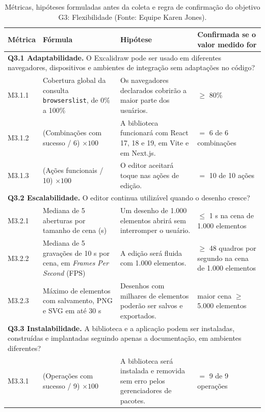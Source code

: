 \documentclass[12pt]{article}
\renewcommand{\arraystretch}{0.9}
\begin{document}
\begin{table}[!ht]
\centering
\caption{Métricas, hipóteses formuladas antes da coleta e regra de confirmação do objetivo G3: Flexibilidade (Fonte: Equipe Karen Jones).}
\label{tab:g3-metricas}
\vspace{2pt}
\scriptsize
\setlength{\tabcolsep}{3pt}
\renewcommand{\arraystretch}{0.90}
\begin{tabular}{p{1.2cm}p{5.5cm}p{5.0cm}p{3.6cm}}
\toprule
\textbf{Métrica} & \textbf{Fórmula} & \textbf{Hipótese} & \textbf{Confirmada se o valor medido for} \\
\midrule
\multicolumn{4}{p{16.2cm}}{\textbf{Q3.1 Adaptabilidade.} O Excalidraw pode ser usado em diferentes navegadores, dispositivos e ambientes de integração sem adaptações no código?} \\
M3.1.1 & Cobertura global da consulta \texttt{browserslist}, de 0\% a 100\% & Os navegadores declarados cobrirão a maior parte dos usuários. & $\geq$ 80\% \\
M3.1.2 & (Combinações com sucesso / 6) $\times 100$ & A biblioteca funcionará com React 17, 18 e 19, em Vite e em Next.js. & $=$ 6 de 6 combinações \\
M3.1.3 & (Ações funcionais / 10) $\times 100$ & O editor aceitará toque nas ações de edição. & $=$ 10 de 10 ações \\
\midrule
\multicolumn{4}{p{16.2cm}}{\textbf{Q3.2 Escalabilidade.} O editor continua utilizável quando o desenho cresce?} \\
M3.2.1 & Mediana de 5 aberturas por tamanho de cena (s) & Um desenho de 1.000 elementos abrirá sem interromper o usuário. & $\leq$ 1 s na cena de 1.000 elementos \\
M3.2.2 & Mediana de 5 gravações de 10 s por cena, em \textit{Frames Per Second} (FPS) & A edição será fluida com 1.000 elementos. & $\geq$ 48 quadros por segundo na cena de 1.000 elementos \\
M3.2.3 & Máximo de elementos com salvamento, PNG e SVG em até 30 s & Desenhos com milhares de elementos poderão ser salvos e exportados. & maior cena $\geq$ 5.000 elementos \\
\midrule
\multicolumn{4}{p{16.2cm}}{\textbf{Q3.3 Instalabilidade.} A biblioteca e a aplicação podem ser instaladas, construídas e implantadas seguindo apenas a documentação, em ambientes diferentes?} \\
M3.3.1 & (Operações com sucesso / 9) $\times 100$ & A biblioteca será instalada e removida sem erro pelos gerenciadores de pacotes. & $=$ 9 de 9 operações \\

\end{tabular}
\end{table}
\end{document}
